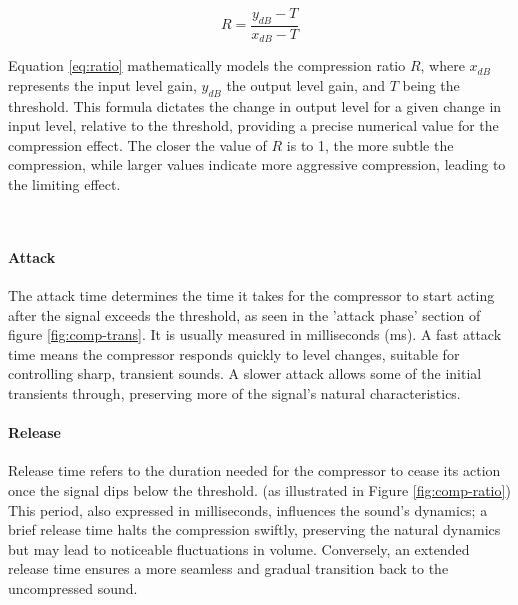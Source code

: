 \documentclass[10pt]{article}
\begin{document}
\begin{multicols*}{2}
                \begin{equation} \label{eq:ratio}
                    R=\frac{y_{dB}-T}{x_{dB}-T}
                \end{equation}

                \noindent Equation \ref{eq:ratio} mathematically models the compression ratio $R$, where $x_{dB}$ represents the input level gain, $y_{dB}$ the output level gain, and $T$ being the threshold. This formula dictates the change in output level for a given change in input level, relative to the threshold, providing a precise numerical value for the compression effect. The closer the value of $R$ is to 1, the more subtle the compression, while larger values indicate more aggressive compression, leading to the limiting effect.

                \noindent
                \begin{minipage}{\linewidth}
                    \centering
                    
                    \label{fig:comp-trans}
                \end{minipage}\\

            \paragraph{Attack}
                The attack time determines the time it takes for the compressor to start acting after the signal exceeds the threshold, as seen in the 'attack phase' section of figure \ref{fig:comp-trans}. It is usually measured in milliseconds (ms). A fast attack time means the compressor responds quickly to level changes, suitable for controlling sharp, transient sounds. A slower attack allows some of the initial transients through, preserving more of the signal's natural characteristics.

            \paragraph{Release}
                Release time refers to the duration needed for the compressor to cease its action once the signal dips below the threshold. (as illustrated in Figure \ref{fig:comp-ratio}) This period, also expressed in milliseconds, influences the sound's dynamics; a brief release time halts the compression swiftly, preserving the natural dynamics but may lead to noticeable fluctuations in volume. Conversely, an extended release time ensures a more seamless and gradual transition back to the uncompressed sound.


\end{multicols*}
\end{document}
